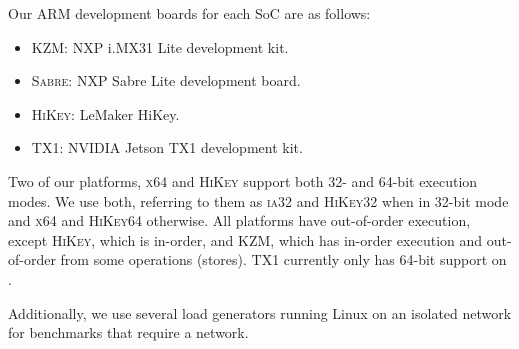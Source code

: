 Our ARM development boards for each \gls{SoC} are as follows:
\begin{itemize}
    \item \textsc{KZM}: NXP i.MX31 Lite development kit.
    \item \textsc{Sabre}: NXP Sabre Lite development board.
    \item \textsc{HiKey}: LeMaker HiKey. 
    \item \textsc{TX1}: NVIDIA Jetson TX1 development kit.
\end{itemize}

Two of our platforms, \textsc{x64} and \textsc{HiKey} support both 32- and 64-bit execution modes.
We use both, referring to them as \textsc{ia32} and \textsc{HiKey32} when in 32-bit mode and
\textsc{x64} and \textsc{HiKey64} otherwise. All platforms have out-of-order execution, except
\textsc{HiKey}, which is in-order, and \textsc{KZM}, which has in-order execution and out-of-order
from some operations (\eg stores). \textsc{TX1} currently only has 64-bit support on \selfour.

Additionally, we use several load generators running Linux on an isolated network for 
benchmarks that require a network.

